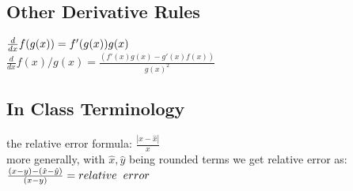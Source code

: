 \subsection*{Other Derivative Rules}
$\frac{d}{dx} f(g(x)) = f'(g(x))g(x) \hspace{1mm}$\\
$\frac{d}{dx} f(x)/g(x) = \frac{(f'(x)g(x) - g'(x)f(x))}{g(x)^2}$\\


\subsection*{In Class Terminology}
the relative error formula:
$ \frac{|x - \hat{x}|}{x} $\\
more generally, with $\hat{x},\hat{y}$ being rounded terms we get relative error as:\\
$\frac{(x-y) - (\hat{x}-\hat{y})}{(x-y)} = relative \hspace{2mm} error$\\
